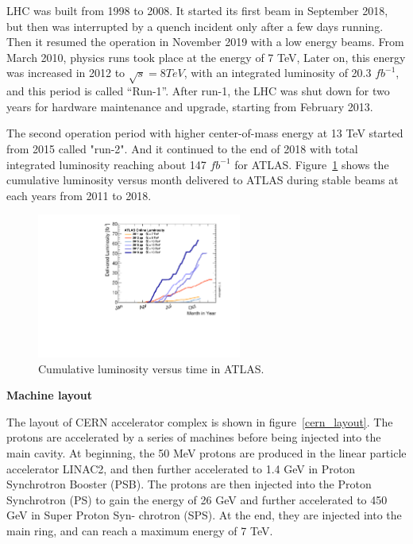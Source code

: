 LHC was built from 1998 to 2008. 
It started its first beam in September 2018, but then was interrupted by a quench incident only after a few days running.
Then it resumed the operation in November 2019 with a low energy beams.
From March 2010, physics runs took place at the energy of 7 TeV,
Later on, this energy was increased in 2012 to $\sqrt{s} = 8TeV$, with an integrated luminosity of 20.3 $fb^{-1}$,
and this period is called “Run-1”.
After run-1, the LHC was shut down for two years for hardware maintenance and upgrade, starting from February 2013.

The second operation period with higher center-of-mass energy at 13 TeV started from 2015 called "run-2".
And it continued to the end of 2018 with total integrated luminosity reaching about 147 $fb^{-1}$ for ATLAS.
Figure~\ref{fig:lumi_vs_month} shows the cumulative luminosity versus month delivered to ATLAS during stable beams 
at each years from 2011 to 2018.
\begin{figure}[!htb]
  \centering
  \includegraphics[width=0.6\textwidth]{figures/Detector/intlumivsyear.pdf}
  \caption{Cumulative luminosity versus time in ATLAS.}
  \label{fig:lumi_vs_month}
\end{figure}

\textbf{Machine layout}

The layout of CERN accelerator complex is shown in figure~\ref{cern_layout}.
The protons are accelerated by a series of machines before being injected into the main cavity.
At beginning, the 50 MeV protons are produced in the linear particle accelerator LINAC2, 
and then further accelerated to 1.4 GeV in Proton Synchrotron Booster (PSB).
The protons are then injected into the Proton Synchrotron (PS) to gain the energy of 26 GeV
and further accelerated to 450 GeV in Super Proton Syn- chrotron (SPS).
At the end, they are injected into the main ring, and can reach a maximum energy of 7 TeV.

